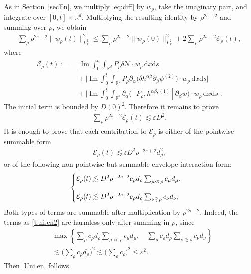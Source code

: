 \documentclass[11pt,letterpaper,reqno]{amsart}
\numberwithin{equation}{section}
\theoremstyle{definition}
\theoremstyle{remark}
\begin{document}
 
As in Section~\ref{secEn}, we multiply \eqref{eq:diff} by
\(\overline w_\rho\), take the imaginary part, and integrate over
\([0,t]\times\mathbb R^d\). Multiplying the resulting identity by
\(\rho^{2s-2}\) and summing over \(\rho\), we obtain
\begin{align*}
\sum_\rho
\rho^{2s-2}
\|w_\rho(t)\|_{L^2_x}^2
\leq
\sum_\rho
\rho^{2s-2}
\|w_\rho(0)\|_{L^2_x}^2
+
2\sum_\rho
\rho^{2s-2}\mathcal{E}_\rho(t),
\end{align*} 
where
\begin{align}
  \mathcal{E}_\rho(t):=  &\,\Big| \operatorname{Im} \int_0^t\int_{\mathbb R^d}
   P_\rho\delta \mathcal{N}
 \cdot  \overline{w}_\rho
\,\mathrm{d} x \mathrm{d} s \Big| \label{UA1.term1}\\
 &\, +\Big| \operatorname{Im}\int_0^t\int_{\mathbb R^d}
   P_\rho\partial_\alpha
\big(\delta h^{\alpha\beta}\partial_\beta\psi^{(2)}\big)  
 \cdot \overline{w}_\rho
\,\mathrm{d} x \mathrm{d} s \Big| \label{UA1.term2}\\
&\, + \Big|\operatorname{Im} \int_0^t\int_{\mathbb R^d}
 \partial_\alpha\big([P_\rho,h^{\alpha\beta,(1)}]\partial_\beta w\big) \cdot\overline{w}_\rho
\,\mathrm{d} x \mathrm{d} s \Big|. \label{UA1.term3}
\end{align}
The initial term is bounded by \(D(0)^2\). Therefore it remains to prove
\begin{align}
   \sum_\rho
\rho^{2s-2}\mathcal E_\rho(t)
\lesssim
\varepsilon  D^2. \label{Uni.en}  
\end{align}
It is enough to prove that each contribution to \(\mathcal E_\rho\) is either
of the pointwise summable form
\begin{align}
    \mathcal E_\rho (t)
\lesssim
\varepsilon  D^2\rho^{-2s+2}d_\rho^2,  \label{Uni.en1}   
\end{align}
or of the following non-pointwise but summable envelope interaction form:
\begin{align}
\begin{cases}
       \mathcal E_\rho (t)
\lesssim
D^2\rho^{-2s+2}
c_\rho d_\rho
\sum_{\mu\ll\rho}c_\mu d_\mu,  \vspace{0.4cm}\\
       \mathcal E_\rho (t)
\lesssim
D^2\rho^{-2s+2}
c_\rho d_\rho
\sum_{\nu\gtrsim\rho}c_\nu d_\nu, 
 \end{cases}     \label{Uni.en2} 
\end{align}
Both types of terms are summable after multiplication by
\(\rho^{2s-2}\).  Indeed,
the terms as \eqref{Uni.en2} are harmless only after summing in \(\rho\), since
\begin{align*}
 &   \max\left\{\sum_\rho
c_\rho d_\rho
\sum_{\mu\ll\rho}c_\mu d_\mu, \quad\sum_\rho
c_\rho d_\rho
\sum_{\nu\gtrsim\rho}c_\nu d_\nu\right\} \\
&\lesssim \Big(\sum_\rho c_\rho d_\rho\Big)^2
\lesssim\Big(\sum_\rho c_\rho  \Big)^2 \leq
\varepsilon^2.
\end{align*}
Then  \eqref{Uni.en}  follows.
\end{document}
